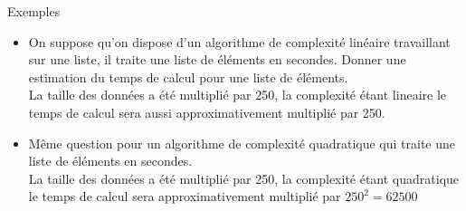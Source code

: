 \documentclass[10pt]{beamer}
\begin{document}
\begin{frame}[fragile]{\Ctitle}{\stitle}
	\begin{exampleblock}{Exemples}
		\begin{itemize}
			\item<1-> On suppose qu'on dispose d'un algorithme de complexité linéaire travaillant sur une liste, il traite une liste de  éléments en  secondes. Donner une estimation du temps de calcul pour une liste de  éléments.\\
				\onslide<2-> {\textcolor{OliveGreen}{La taille des données a été multiplié par 250, la complexité étant lineaire le temps de calcul sera aussi approximativement multiplié par 250. \\}}
				\onslide<3->{\textcolor{OliveGreen}{$0.015 \times 250 = 3.75$, on peut donc prévoir un temps de calcul d'environ 3,75 secondes}}
			\item<4-> Même question pour un algorithme de complexité quadratique qui traite une liste de  éléments en  secondes.\\
				\onslide<5-> {\textcolor{OliveGreen}{La taille des données a été multiplié par 250, la complexité étant quadratique le temps de calcul sera  approximativement multiplié par $250^2=62500$ \\}}
				\onslide<6->{\textcolor{OliveGreen}{$0.07 \times 62\,500 = 4375$, on peut donc prévoir un temps de calcul d'environ $4\,375$ secondes, c'est-à-dire près d'une heure et 15 minutes !}}
		\end{itemize}
	\end{exampleblock}
\end{frame}
\end{document}
